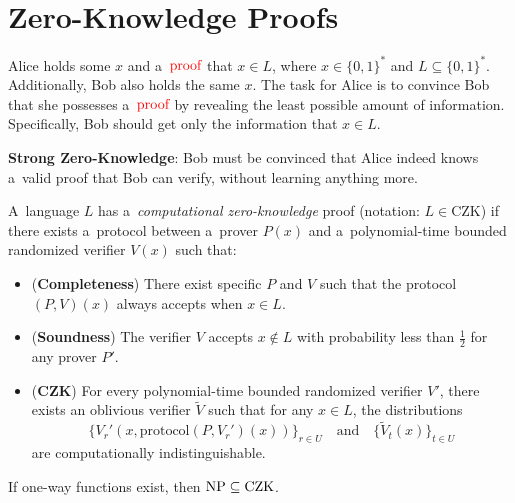 
\section{Zero-Knowledge Proofs}

Alice holds some $x$ and a~$\textcolor{red}{\text{proof}}$ that $x \in L$, where $x \in \{ 0, 1 \}^{*}$ and $L \subseteq  \{ 0, 1 \}^{*}$.
Additionally, Bob also holds the same $x$.
The task for Alice is to convince Bob that she possesses a~$\textcolor{red}{\text{proof}}$ by revealing the least possible amount of information. 
Specifically, Bob should get only the information that $x \in  L$.

\textbf{Strong Zero-Knowledge}: Bob must be convinced that Alice indeed knows a~valid proof that Bob can verify, without learning anything more.

\begin{definition}
    A~language $L$ has a~\emph{computational zero-knowledge} proof (notation: $L \in \mathrm{CZK}$) if there exists a~protocol between a~prover $P(x)$ and a~polynomial-time bounded randomized verifier $V(x)$ such that:
    \begin{itemize}
        \item (\textbf{Completeness}) There exist specific $P$ and $V$ such that the protocol $(P, V)(x)$ always accepts when $x \in L$.
        
        \item (\textbf{Soundness}) The verifier $V$ accepts $x \not\in L$ with probability less than $\frac{1}{2}$ for any prover $P'$.
        
        \item (\textbf{CZK}) For every polynomial-time bounded randomized verifier $V'$, there exists an oblivious verifier $\tilde{V}$ such that for any $x \in L$, the distributions
        \[
            \{ V_r'(x, \text{protocol}(P, V_r')(x)) \}_{r \in U} \quad \text{and} \quad \{ \tilde{V}_t(x) \}_{t \in U}
        \]
        are computationally indistinguishable.
    \end{itemize}
\end{definition}

\begin{theorem}
    If one-way functions exist, then $\operatorname{NP} \subseteq \mathrm{CZK}$.
\end{theorem}

